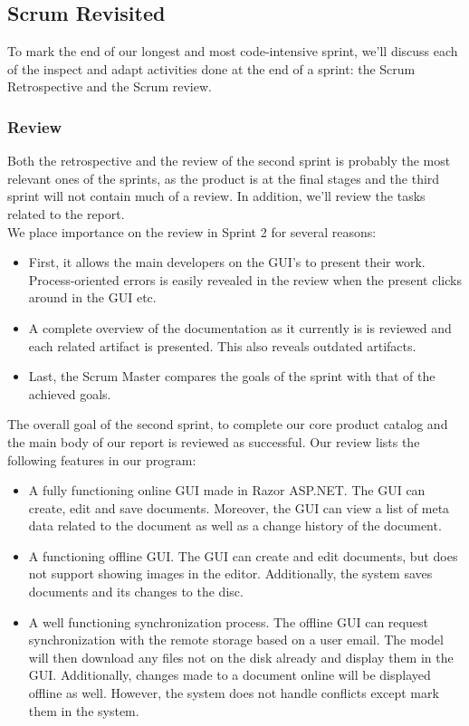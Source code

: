 \subsection{Scrum Revisited}
To mark the end of our longest and most code-intensive sprint, we'll discuss each of the inspect and adapt activities done at the end of a sprint: the Scrum Retrospective and the Scrum review.
\subsubsection{Review}
Both the retrospective and the review of the second sprint is probably the most relevant ones of the sprints, as the product is at the final stages and the third sprint will not contain much of a review. In addition, we'll review the tasks related to the report. \\
We place importance on the review in Sprint 2 for several reasons:
\begin{itemize}
\item First, it allows the main developers on the GUI's to present their work. Process-oriented errors is easily revealed in the review when the present clicks around in the GUI etc.
\item A complete overview of the documentation as it currently is is reviewed and each related artifact is presented. This also reveals outdated artifacts.
\item Last, the Scrum Master compares the goals of the sprint with that of the achieved goals. 
\end{itemize}
The overall goal of the second sprint, to complete our core product catalog and the main body of our report is reviewed as successful. Our review lists the following features in our program:
\begin{itemize}
\item A fully functioning online GUI made in Razor ASP.NET. The GUI can create, edit and save documents. Moreover, the GUI can view a list of meta data related to the document as well as a change history of the document.
\item A functioning offline GUI. The GUI can create and edit documents, but does not support showing images in the editor. Additionally, the system saves documents and its changes to the disc.
\item A well functioning synchronization process. The offline GUI can request synchronization with the remote storage based on a user email. The model will then download any files not on the disk already and display them in the GUI. Additionally, changes made to a document online will be displayed offline as well. However, the system does not handle conflicts except mark them in the system.
\end{itemize}
